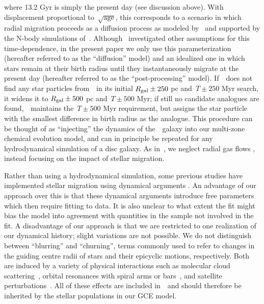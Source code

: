 \documentclass[ms.tex]{subfiles}
\begin{document}
where 13.2 Gyr is simply the present day (see discussion above).
With displacement proportional to~$\sqrt{\text{age}}$, this corresponds to a
scenario in which radial migration proceeds as a diffusion process as modeled
by~\citet{Frankel2018, Frankel2019} and supported by the N-body simulations
of~\citet*{Brunetti2011}.
Although~\citet{Johnson2021} investigated other assumptions for this
time-dependence, in the present paper we only use this parameterization
(hereafter referred to as the ``diffusion'' model) and an idealized one in
which stars remain at their birth radius until they instantaneously migrate at
the present day (hereafter referred to as the ``post-processing'' model).
If~\vice~does not find any star particles from~\hsim~in its initial
$R_\text{gal} \pm 250$ pc and~$T \pm 250$ Myr search, it widens it to
$R_\text{gal} \pm 500$ pc and~$T \pm 500$ Myr; if still no candidate analogues are
found,~\vice~maintains the~$T \pm 500$ Myr requirement, but assigns the star
particle with the smallest difference in birth radius as the analogue.
This procedure can be thought of as ``injecting'' the dynamics of
the~\hsim~galaxy into our multi-zone chemical evolution model, and can in
principle be repeated for any hydrodynamical simulation of a disc galaxy.
As in~\citet{Johnson2021}, we neglect radial gas flows
\citep[e.g.][]{Lacey1985, Bilitewski2012, Vincenzo2020}, instead focusing on
the impact of stellar migration.
\par
Rather than using a hydrodynamical simulation, some previous studies have
implemented stellar migration using dynamical arguments
\citep[e.g.][]{Schoenrich2009, Sharma2021}.
An advantage of our approach over this is that these dynamical arguments
introduce free parameters which then require fitting to data.
It is also unclear to what extent the fit might bias the model into agreement
with quantities in the sample not involved in the fit.
A disadvantage of our approach is that we are restricted to one realization of
our dynamical history; slight variations are not possible.
We do not distinguish between ``blurring'' and ``churning'', terms commonly
used to refer to changes in the guiding centre radii of stars and their
epicyclic motions, respectively.
Both are induced by a variety of physical interactions such as molecular cloud
scattering~\citep{Mihalas1981, Jenkins1990, Jenkins1992}, orbital resonances
with spiral arms or bars~\citep{Sellwood2002, Minchev2011}, and satellite
perturbations~\citep*{Bird2012}.
All of these effects are included in~\hsim~and should therefore be inherited by
the stellar populations in our GCE model.
\end{document}
